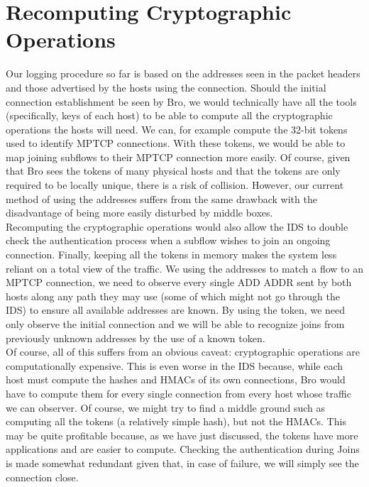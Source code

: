 \section{Recomputing Cryptographic Operations}
Our logging procedure so far is based on the addresses seen in the packet headers and those advertised by the hosts using the connection. Should the initial connection establishment be seen by Bro, we would technically have all the tools (specifically, keys of each host) to be able to compute all the cryptographic operations the hosts will need. We can, for example compute the 32-bit tokens used to identify MPTCP connections. With these tokens, we would be able to map joining subflows to their MPTCP connection more easily. Of course, given that Bro sees the tokens of many physical hosts and that the tokens are only required to be locally unique, there is a risk of collision. However, our current method of using the addresses suffers from the same drawback with the disadvantage of being more easily disturbed by middle boxes. \\

Recomputing the cryptographic operations would also allow the IDS to double check the authentication process when a subflow wishes to join an ongoing connection. Finally, keeping all the tokens in memory makes the system less reliant on a total view of the traffic. We using the addresses to match a flow to an MPTCP connection, we need to observe every single ADD ADDR sent by both hosts along any path they may use (some of which might not go through the IDS) to ensure all available addresses are known. By using the token, we need only observe the initial connection and we will be able to recognize joins from previously unknown addresses by the use of a known token. \\

Of course, all of this suffers from an obvious caveat: cryptographic operations are computationally expensive. This is even worse in the IDS because, while each host must compute the hashes and HMACs of its own connections, Bro would have to compute them for every single connection from every host whose traffic we can observer. Of course, we might try to find a middle ground such as computing all the tokens (a relatively simple hash), but not the HMACs. This may be quite profitable because, as we have just discussed, the tokens have more applications and are easier to compute. Checking the authentication during Joins is made somewhat redundant given that, in case of failure, we will simply see the connection close.


